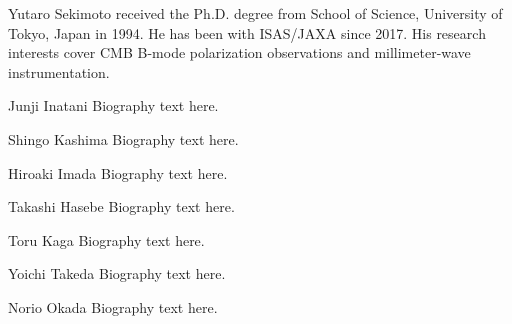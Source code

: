 \documentclass[journal]{IEEEtran}
\begin{document}
%
%
\begin{IEEEbiographynophoto}{Yutaro Sekimoto}
received the Ph.D. degree from School of Science, University of Tokyo, Japan in 1994. 
He has been with ISAS/JAXA since 2017.
His research interests cover CMB B-mode polarization observations and millimeter-wave instrumentation.
\end{IEEEbiographynophoto}
%
\begin{IEEEbiographynophoto}{Junji Inatani}
Biography text here.
\end{IEEEbiographynophoto}
%
\begin{IEEEbiographynophoto}{Shingo Kashima}
Biography text here.
\end{IEEEbiographynophoto}
%
\begin{IEEEbiographynophoto}{Hiroaki Imada}
Biography text here.
\end{IEEEbiographynophoto}
%
\begin{IEEEbiographynophoto}{Takashi Hasebe}
Biography text here.
\end{IEEEbiographynophoto}
\begin{IEEEbiographynophoto}{Toru Kaga}
Biography text here.
\end{IEEEbiographynophoto}
%
\begin{IEEEbiographynophoto}{Yoichi Takeda}
Biography text here.
\end{IEEEbiographynophoto}
%
%
\begin{IEEEbiographynophoto}{Norio Okada}
Biography text here.
\end{IEEEbiographynophoto}
%
%
%
\end{document}
